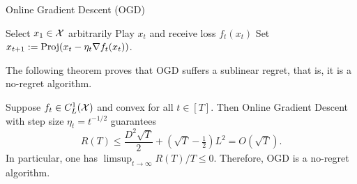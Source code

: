 \begin{algorithm}[ht] 
\caption{Online Gradient Descent (OGD)}
\label{alg:ogd}
\begin{algorithmic}
    \STATE Select $x_1 \in \mathcal{X}$ arbitrarily
        \STATE Play $x_t$ and receive loss $f_t(x_t)$
        \STATE Set $x_{t+1} := \operatorname{Proj}(x_t - \eta_t \nabla f_t(x_t))$.
    \ENDFOR
\end{algorithmic}
\end{algorithm}
The following theorem proves that OGD suffers a sublinear regret, that is, it is a no-regret algorithm.
\begin{theorem}\label{thm:ogd} 
    Suppose $f_t\in C^1_L(\mathcal{X})$ and convex for all $t\in [T]$. Then Online Gradient Descent with step size $\eta_t = t^{-1/2}$ guarantees 
  \begin{equation}
      R(T) \leq \frac{D^2\sqrt{T}}{2} + (\sqrt{T} - \tfrac{1}{2})L^2 = O(\sqrt{T}).
    \label{eq:ogdregret}
  \end{equation}
  In particular, one has $\limsup_{t\to\infty} R(T)/T \leq 0$. Therefore, OGD is a no-regret algorithm.
\end{theorem}
